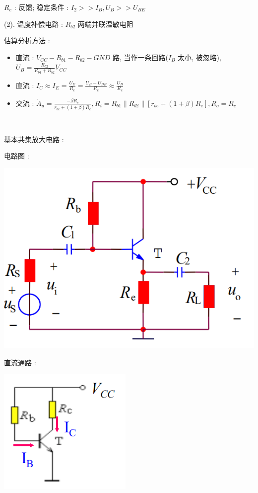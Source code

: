 \documentclass[UTF8, 12pt]{ctexart}
\begin{document}
	$ R_{e} $ : 反馈; 稳定条件 : $ I_{2} >> I_{B}, U_{B} >> U_{BE} $

	(2). 温度补偿电路 : $ R_{b2} $ 两端并联温敏电阻

	估算分析方法 :
	\begin{itemize}[leftmargin = 4em]
		\item 直流 : $ V_{CC}-R_{b1}-R_{b2}-GND $ 路, 当作一条回路($ I_{B} $ 太小, 被忽略), $ U_{B} = \frac{R_{b2}}{R_{b1}+R_{b2}}V_{CC} $
		\item 直流 : $ I_{C} \approx I_{E} = \frac{U_{E}}{R_{e}} = \frac{U_{B} - U_{BE}}{R_{e}} \approx \frac{U_{B}}{R_{e}} $
		\item 交流 : $ \dot{A}_{u} = \frac{-\beta R_{c}}{r_{be} + (1+\beta)R_{e}}, R_{i} = R_{b1} \parallel R_{b2} \parallel [r_{be} + (1+\beta)R_{e}], R_{o} = R_{c} $
	\end{itemize}

	~

	\noindent
	基本共集放大电路 :

	电路图 :

	\includegraphics[scale = 0.4]{02/基本共集放大电路电路图.png}

	直流通路 :

	\includegraphics[scale = 0.4]{02/基本共射放大电路直流通路.png}
\end{document}
